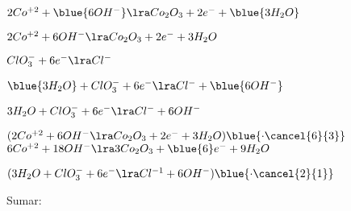 \documentclass[../Práctica.root.tex]{subfiles}
\begin{document}
\begin{enumerate}
\begin{enumerate}
\begin{itemize}
\begin{multicols}{2}

                                  $2 Co^{+2} + \blue{6 OH^-} \lra Co_2O_3 + 2 e^- + \blue{3H_2O}$


                                  $2 Co^{+2} + 6 OH^- \lra Co_2O_3 + 2 e^- + 3 H_2O$

                                  \columnbreak

                                  $ClO_3^- + 6 e^- \lra Cl^-$


                                  $\blue{3H_2O} + ClO_3^- + 6 e^- \lra Cl^- + \blue{6OH^-}$


                                  $3 H_2O + ClO_3^- + 6 e^- \lra Cl^- + 6 OH^-$
                              \end{multicols}
                              \begin{multicols}{2}
                                  $(2 Co^{+2} + 6 OH^- \lra Co_2O_3 + 2 e^- + 3 H_2O)\blue{\cdot\cancel{6}{3}}$ \\
                                  $6 Co^{+2} + 18 OH^- \lra 3 Co_2O_3 + \blue{6} e^- + 9 H_2O$

                                  \columnbreak

                                  $(3 H_2O + ClO_3^- + 6 e^- \lra Cl^{-1} + 6 OH^-)\blue{\cdot\cancel{2}{1}}$
                              \end{multicols}
                              Sumar:


\end{itemize}
\end{enumerate}
\end{enumerate}
\end{document}
